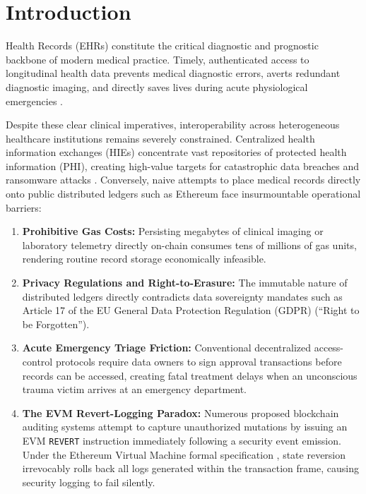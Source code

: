 \documentclass[journal,10pt,twocolumn]{IEEEtran}
\begin{document}
\section{Introduction}
 Health Records (EHRs) constitute the critical diagnostic and prognostic backbone of modern medical practice. Timely, authenticated access to longitudinal health data prevents medical diagnostic errors, averts redundant diagnostic imaging, and directly saves lives during acute physiological emergencies \cite{ekblaw2016medrec}. 

Despite these clear clinical imperatives, interoperability across heterogeneous healthcare institutions remains severely constrained. Centralized health information exchanges (HIEs) concentrate vast repositories of protected health information (PHI), creating high-value targets for catastrophic data breaches and ransomware attacks \cite{dagher2018ancile}. Conversely, naive attempts to place medical records directly onto public distributed ledgers such as Ethereum face insurmountable operational barriers:
\begin{enumerate}
    \item \textbf{Prohibitive Gas Costs:} Persisting megabytes of clinical imaging or laboratory telemetry directly on-chain consumes tens of millions of gas units, rendering routine record storage economically infeasible.
    \item \textbf{Privacy Regulations and Right-to-Erasure:} The immutable nature of distributed ledgers directly contradicts data sovereignty mandates such as Article 17 of the EU General Data Protection Regulation (GDPR) (``Right to be Forgotten'').
    \item \textbf{Acute Emergency Triage Friction:} Conventional decentralized access-control protocols require data owners to sign approval transactions before records can be accessed, creating fatal treatment delays when an unconscious trauma victim arrives at an emergency department.
    \item \textbf{The EVM Revert-Logging Paradox:} Numerous proposed blockchain auditing systems attempt to capture unauthorized mutations by issuing an EVM \texttt{REVERT} instruction immediately following a security event emission. Under the Ethereum Virtual Machine formal specification \cite{wood2014ethereum}, state reversion irrevocably rolls back all logs generated within the transaction frame, causing security logging to fail silently.
\end{enumerate}
\end{document}
